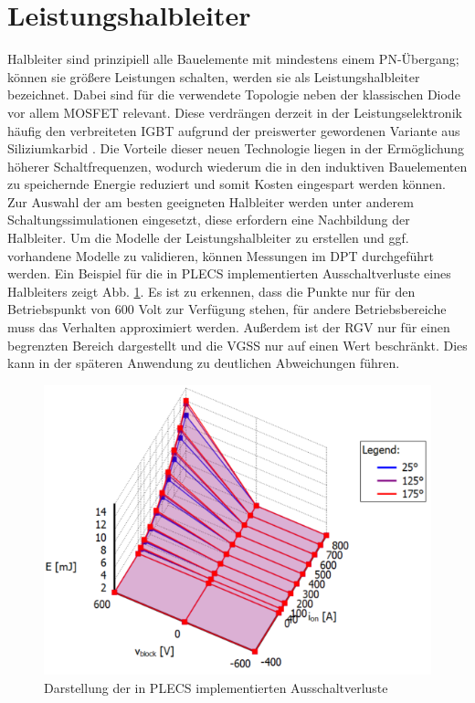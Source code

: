 \section{Leistungshalbleiter}
	Halbleiter sind prinzipiell alle Bauelemente mit mindestens einem PN-Übergang; können sie größere Leistungen schalten, werden sie als Leistungshalbleiter bezeichnet. Dabei sind für die verwendete Topologie neben der klassischen Diode vor allem \gls{MOSFET} relevant. Diese verdrängen derzeit in der Leistungselektronik häufig den verbreiteten IGBT aufgrund der preiswerter gewordenen Variante aus Siliziumkarbid \cite{SiCTrend}. Die Vorteile dieser neuen Technologie liegen in der Ermöglichung höherer Schaltfrequenzen, wodurch wiederum die in den induktiven Bauelementen zu speichernde Energie reduziert und somit Kosten eingespart werden können.\\
	Zur Auswahl der am besten geeigneten Halbleiter werden unter anderem Schaltungssimulationen eingesetzt, diese erfordern eine Nachbildung der Halbleiter. Um die Modelle der Leistungshalbleiter zu erstellen und ggf. vorhandene Modelle zu validieren, können Messungen im \gls{DPT} durchgeführt werden. Ein Beispiel für die in \gls{PLECS} implementierten Ausschaltverluste eines Halbleiters zeigt Abb. \ref{fig:plecsff2thermalmodel}. Es ist zu erkennen, dass die Punkte nur für den Betriebspunkt von 600 Volt zur Verfügung stehen, für andere Betriebsbereiche muss das Verhalten approximiert werden. Außerdem ist der \gls{RGV} nur für einen begrenzten Bereich dargestellt und die \gls{VGSS} nur auf einen Wert beschränkt. Dies kann in der späteren Anwendung zu deutlichen Abweichungen führen. 
	\begin{figure}
		\centering
		\includegraphics[width=0.7\linewidth]{content/Grafiken/PLECS_FF2ThermalModel}
		\caption{Darstellung der in PLECS implementierten Ausschaltverluste \cite{IFAGFF2}}
		\label{fig:plecsff2thermalmodel}
	\end{figure}

